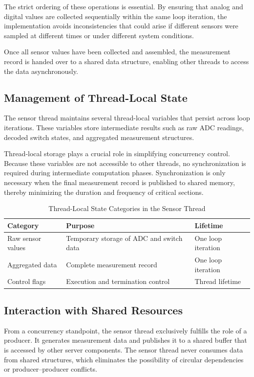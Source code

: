 The strict ordering of these operations is essential. By ensuring that analog and digital values are collected sequentially within the same loop iteration, the implementation avoids inconsistencies that could arise if different sensors were sampled at different times or under different system conditions.

Once all sensor values have been collected and assembled, the measurement record is handed over to a shared data structure, enabling other threads to access the data asynchronously.



\subsection{Management of Thread-Local State}
The sensor thread maintains several thread-local variables that persist across loop iterations. These variables store intermediate results such as raw ADC readings, decoded switch states, and aggregated measurement structures.

Thread-local storage plays a crucial role in simplifying concurrency control. Because these variables are not accessible to other threads, no synchronization is required during intermediate computation phases. Synchronization is only necessary when the final measurement record is published to shared memory, thereby minimizing the duration and frequency of critical sections.


\begin{table}[h]
    \centering
    \begin{tabular}{|l|l|l|}
        \hline
        \textbf{Category} & \textbf{Purpose} & \textbf{Lifetime} \\
        \hline
        Raw sensor values & Temporary storage of ADC and switch data & One loop iteration \\
        \hline
        Aggregated data & Complete measurement record & One loop iteration \\
        \hline
        Control flags & Execution and termination control & Thread lifetime \\
        \hline
    \end{tabular}
    \caption{Thread-Local State Categories in the Sensor Thread}
    \label{tab-ameer1}
\end{table}

\subsection{Interaction with Shared Resources}
From a concurrency standpoint, the sensor thread exclusively fulfills the role of a producer. It generates measurement data and publishes it to a shared buffer that is accessed by other server components. The sensor thread never consumes data from shared structures, which eliminates the possibility of circular dependencies or producer–producer conflicts.

